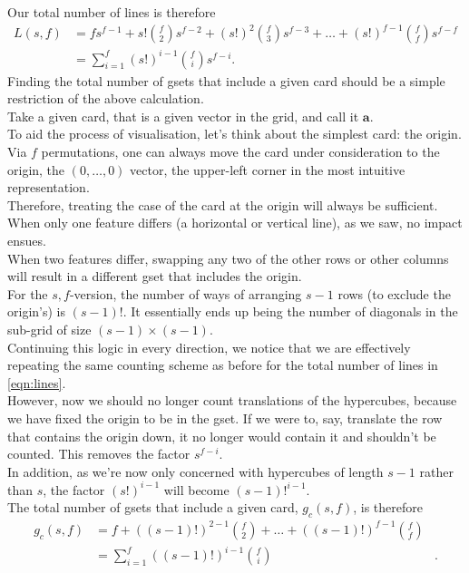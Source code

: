 \documentclass{article}
\theoremstyle{definition}
\theoremstyle{remark}
\begin{document}
Our total number of lines is therefore
\begin{align} \label{eqn:lines}
    L(s,f)&=fs^{f-1}+s!\binom{f}{2}s^{f-2}+(s!)^2\binom{f}{3}s^{f-3}+\dots+(s!)^{f-1}\binom{f}{f}s^{f-f}\nonumber\\
    &=\sum_{i=1}^f (s!)^{i-1}\binom{f}{i}s^{f-i}.
\end{align}
\bigbreak
Finding the total number of gsets that include a given card should be a simple restriction of the above calculation.\\
Take a given card, that is a given vector in the grid, and call it $\mathbf{a}$.\\ 
To aid the process of visualisation, let's think about the simplest card: the origin. \\
Via $f$ permutations, one can always move the card under consideration to the origin, the $(0,\dots,0)$ vector, the upper-left corner in the most intuitive representation.\\
Therefore, treating the case of the card at the origin will always be sufficient.
\medbreak
When only one feature differs (a horizontal or vertical line), as we saw, no impact ensues.\\
When two features differ, swapping any two of the other rows or other columns will result in a different gset that includes the origin.\\
For the $s,f$-version, the number of ways of arranging $s-1$ rows (to exclude the origin's) is $(s-1)!$. 
It essentially ends up being the number of diagonals in the sub-grid of size $(s-1)\times(s-1)$. \\
Continuing this logic in every direction, we notice that we are effectively repeating the same counting scheme as before for the total number of lines in \autoref{eqn:lines}.\\
However, now we should no longer count translations of the hypercubes, because we have fixed the origin to be in the gset. If we were to, say, translate the row that contains the origin down, it no longer would contain it and shouldn't be counted. This removes the factor $s^{f-i}$.\\
In addition, as we're now only concerned with hypercubes of length $s-1$ rather than $s$, the factor $(s!)^{i-1}$ will become $(s-1)!^{i-1}$.\\
The total number of gsets that include a given card, $g_c(s,f)$, is therefore 
\begin{align} \label{eqn:gc1}
    g_c(s,f)&=f+((s-1)!)^{2-1} \binom{f}{2}+\dots+((s-1)!)^{f-1} \binom{f}{f} \nonumber &\\
    &= \sum_{i=1}^f ((s-1)!)^{i-1}\binom{f}{i} &.
\end{align}
\end{document}
